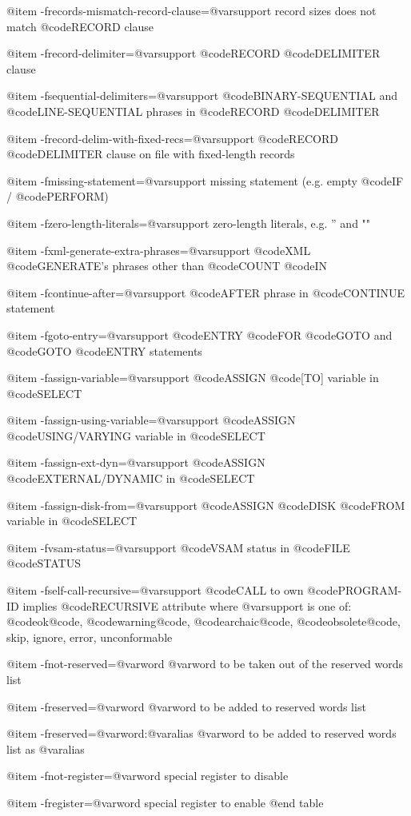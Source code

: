 @item -frecords-mismatch-record-clause=@var{support}
record sizes does not match @code{RECORD} clause

@item -frecord-delimiter=@var{support}
@code{RECORD} @code{DELIMITER} clause

@item -fsequential-delimiters=@var{support}
@code{BINARY-SEQUENTIAL} and @code{LINE-SEQUENTIAL} phrases in @code{RECORD} @code{DELIMITER}

@item -frecord-delim-with-fixed-recs=@var{support}
@code{RECORD} @code{DELIMITER} clause on file with fixed-length records

@item -fmissing-statement=@var{support}
missing statement (e.g. empty @code{IF} / @code{PERFORM})

@item -fzero-length-literals=@var{support}
zero-length literals, e.g. '' and ""

@item -fxml-generate-extra-phrases=@var{support}
@code{XML} @code{GENERATE'}s phrases other than @code{COUNT} @code{IN}

@item -fcontinue-after=@var{support}
@code{AFTER} phrase in @code{CONTINUE} statement

@item -fgoto-entry=@var{support}
@code{ENTRY} @code{FOR} @code{GOTO} and @code{GOTO} @code{ENTRY} statements

@item -fassign-variable=@var{support}
@code{ASSIGN} @code{[TO]} variable in @code{SELECT}

@item -fassign-using-variable=@var{support}
@code{ASSIGN} @code{USING/VARYING} variable in @code{SELECT}

@item -fassign-ext-dyn=@var{support}
@code{ASSIGN} @code{EXTERNAL/DYNAMIC} in @code{SELECT}

@item -fassign-disk-from=@var{support}
@code{ASSIGN} @code{DISK} @code{FROM} variable in @code{SELECT}

@item -fvsam-status=@var{support}
@code{VSAM} status in @code{FILE} @code{STATUS}

@item -fself-call-recursive=@var{support}
@code{CALL} to own @code{PROGRAM-ID} implies @code{RECURSIVE} attribute
	where @var{support} is one of:
	@code{ok@code{, @code{warning@code{, @code{archaic@code{, @code{obsolete@code{, }skip}, }ignore}, }error}, }unconformable}

@item -fnot-reserved=@var{word}
@var{word} to be taken out of the reserved words list

@item -freserved=@var{word}
@var{word} to be added to reserved words list

@item -freserved=@var{word}:@var{alias}
@var{word} to be added to reserved words list as @var{alias}

@item -fnot-register=@var{word}
special register to disable

@item -fregister=@var{word}
special register to enable
@end table
